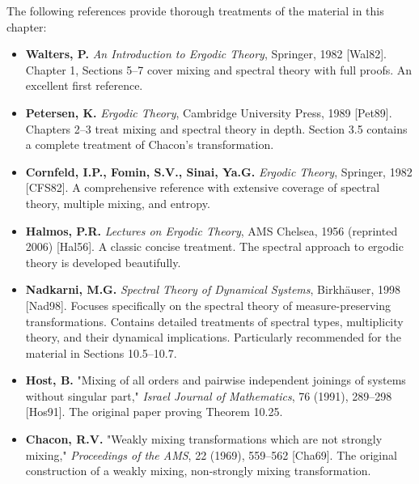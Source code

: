The following references provide thorough treatments of the material in this chapter:

\begin{itemize}[nosep]
  \item \textbf{Walters, P.} \textit{An Introduction to Ergodic Theory}, Springer, 1982 [Wal82]. Chapter 1, Sections 5--7 cover mixing and spectral theory with full proofs. An excellent first reference.

  \item \textbf{Petersen, K.} \textit{Ergodic Theory}, Cambridge University Press, 1989 [Pet89]. Chapters 2--3 treat mixing and spectral theory in depth. Section 3.5 contains a complete treatment of Chacon's transformation.

  \item \textbf{Cornfeld, I.P., Fomin, S.V., Sinai, Ya.G.} \textit{Ergodic Theory}, Springer, 1982 [CFS82]. A comprehensive reference with extensive coverage of spectral theory, multiple mixing, and entropy.

  \item \textbf{Halmos, P.R.} \textit{Lectures on Ergodic Theory}, AMS Chelsea, 1956 (reprinted 2006) [Hal56]. A classic concise treatment. The spectral approach to ergodic theory is developed beautifully.

  \item \textbf{Nadkarni, M.G.} \textit{Spectral Theory of Dynamical Systems}, Birkhäuser, 1998 [Nad98]. Focuses specifically on the spectral theory of measure-preserving transformations. Contains detailed treatments of spectral types, multiplicity theory, and their dynamical implications. Particularly recommended for the material in Sections 10.5--10.7.

  \item \textbf{Host, B.} "Mixing of all orders and pairwise independent joinings of systems without singular part," \textit{Israel Journal of Mathematics}, 76 (1991), 289--298 [Hos91]. The original paper proving Theorem 10.25.

  \item \textbf{Chacon, R.V.} "Weakly mixing transformations which are not strongly mixing," \textit{Proceedings of the AMS}, 22 (1969), 559--562 [Cha69]. The original construction of a weakly mixing, non-strongly mixing transformation.
\end{itemize}
